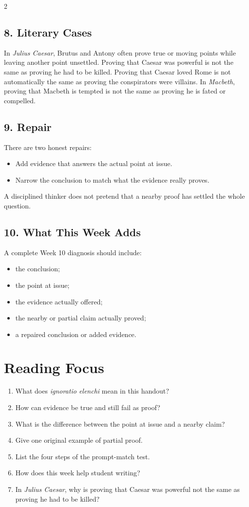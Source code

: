 \documentclass[12pt]{article}
\begin{document}
\begin{multicols}{2}
\subsection*{8. Literary Cases}
In \textit{Julius Caesar}, Brutus and Antony often prove true or moving points while leaving another point unsettled. Proving that Caesar was powerful is not the same as proving he had to be killed. Proving that Caesar loved Rome is not automatically the same as proving the conspirators were villains. In \textit{Macbeth}, proving that Macbeth is tempted is not the same as proving he is fated or compelled.

\subsection*{9. Repair}
There are two honest repairs:
\begin{itemize}[leftmargin=*]
\item Add evidence that answers the actual point at issue.
\item Narrow the conclusion to match what the evidence really proves.
\end{itemize}
A disciplined thinker does not pretend that a nearby proof has settled the whole question.

\subsection*{10. What This Week Adds}
A complete Week 10 diagnosis should include:
\begin{itemize}[leftmargin=*,itemsep=0.12em]
\item the conclusion;
\item the point at issue;
\item the evidence actually offered;
\item the nearby or partial claim actually proved;
\item a repaired conclusion or added evidence.
\end{itemize}

\section*{Reading Focus}
\begin{enumerate}[leftmargin=*]
\item What does \textit{ignoratio elenchi} mean in this handout?
\item How can evidence be true and still fail as proof?
\item What is the difference between the point at issue and a nearby claim?
\item Give one original example of partial proof.
\item List the four steps of the prompt-match test.
\item How does this week help student writing?
\item In \textit{Julius Caesar}, why is proving that Caesar was powerful not the same as proving he had to be killed?
\end{enumerate}


\end{multicols}
\end{document}
